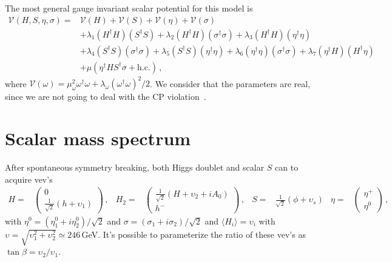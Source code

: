 \documentclass[12pt]{article}
\begin{document}
The most general gauge invariant scalar potential for this model is
%
\begin{align*}
    \mathcal{V}(H, S, \eta, \sigma) = & \mathcal{V}(H) + \mathcal{V}(S) + \mathcal{V}(\eta) + \mathcal{V}(\sigma) \\
    &+  \lambda_{1} (H^{\dagger} H ) (S^{\dagger} S) + \lambda_{2} (H^{\dagger} H ) (\sigma^{\dagger} \sigma ) + \lambda_{3} (H^{\dagger} H ) (\eta^{\dagger} \eta )\\
    &+ \lambda_{4} (S^{\dagger} S) (\sigma^{\dagger} \sigma ) + \lambda_{5} (S^{\dagger} S) (\eta^{\dagger} \eta ) + \lambda_{6} (\eta^{\dagger} \eta ) (\sigma^{\dagger} \sigma ) + \lambda_{7} (\eta^{\dagger} H ) (H^{\dagger} \eta ) \\
    &+ \mu (\eta^{\dagger} H S^{\dagger} \sigma + \text{h.c.})\,,
\end{align*}
%
where $\mathcal{V}(\omega) = \mu^{2}_{\omega} \omega^{\dagger} \omega + \lambda_{\omega} (\omega^{\dagger} \omega)^{2}/2$. We consider that the parameters are real, since we are not going to deal with the CP violation~\cite{Abe:2016sqa}.

\section{Scalar mass spectrum}
\label{sec:ScaMassSpect}

 After spontaneous symmetry breaking, both Higgs doublet and scalar $S$ can to acquire vev's
%
\begin{align*}
    H =& \begin{pmatrix}0 \\ \frac{1}{\sqrt{2}} (h+\upsilon_{1}) \end{pmatrix} \,,
    &H_{2} =& \begin{pmatrix}\frac{1}{\sqrt{2}} (H+\upsilon_{2}+iA_{0}) \\ h^{-} \end{pmatrix} \,, &S =& \frac{1}{\sqrt{2}} (\phi+\upsilon_{s})
    &\eta =& \begin{pmatrix}\eta^{+} \\ \eta^{0} \end{pmatrix} \,,
\end{align*}
%
with $\eta^{0} = (\eta_{1}^{0}+i \eta_{2}^{0})/\sqrt{2}$ and $\sigma = ({\sigma}_{1}+i {\sigma}_{2})/\sqrt{2}$ and $\langle  H_{i} \rangle = \upsilon_{i}$ with $\upsilon=\sqrt{\upsilon_{1}^2+\upsilon_{2}^2} \simeq 246$\,GeV. It's possible to parameterize the ratio of these vev's as $\tan \beta = \upsilon_{2}/\upsilon_{1}$.
\end{document}
